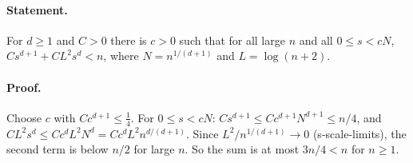 \paragraph{Statement.} For $d\geq1$ and $C>0$ there is $c>0$ such that for all large $n$ and all $0\leq s<cN$,
$Cs^{d+1}+CL^2s^d<n$, where $N=n^{1/(d+1)}$ and $L=\log(n+2)$.
\paragraph{Proof.} Choose $c$ with $Cc^{d+1}\leq\frac14$. For $0\leq s<cN$: $Cs^{d+1}\leq Cc^{d+1}N^{d+1}\leq n/4$,
and $CL^2s^d\leq Cc^dL^2N^d=Cc^dL^2n^{d/(d+1)}$. Since $L^2/n^{1/(d+1)}\to0$ (s-scale-limits), the second
term is below $n/2$ for large $n$. So the sum is at most $3n/4<n$ for $n\geq1$.
